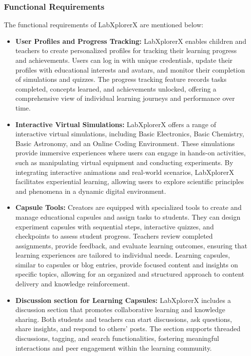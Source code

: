 \subsubsection{Functional Requirements}The functional requirements of LabXplorerX are mentioned below:
\begin{itemize}
    \item \textbf{User Profiles and Progress Tracking:} LabXplorerX enables children and teachers to create personalized profiles for tracking their learning progress and achievements. Users can log in with unique credentials, update their profiles with educational interests and avatars, and monitor their completion of simulations and quizzes. The progress tracking feature records tasks completed, concepts learned, and achievements unlocked, offering a comprehensive view of individual learning journeys and performance over time.

    \item \textbf{Interactive Virtual Simulations:} LabXplorerX offers a range of interactive virtual simulations, including Basic Electronics, Basic Chemistry, Basic Astronomy, and an Online Coding Environment. These simulations provide immersive experiences where users can engage in hands-on activities, such as manipulating virtual equipment and conducting experiments. By integrating interactive animations and real-world scenarios, LabXplorerX facilitates experiential learning, allowing users to explore scientific principles and phenomena in a dynamic digital environment.

    \item \textbf{Capsule Tools: } Creators are equipped with specialized tools to create and manage educational capsules and assign tasks to students. They can design experiment capsules with sequential steps, interactive quizzes, and checkpoints to assess student progress. Teachers review completed assignments, provide feedback, and evaluate learning outcomes, ensuring that learning experiences are tailored to individual needs. Learning capsules, similar to capsules or blog entries, provide focused content and insights on specific topics, allowing for an organized and structured approach to content delivery and knowledge reinforcement.

    \item \textbf{Discussion section for Learning Capsules:} LabXplorerX includes a discussion section that promotes collaborative learning and knowledge sharing. Both students and teachers can start discussions, ask questions, share insights, and respond to others' posts. The section supports threaded discussions, tagging, and search functionalities, fostering meaningful interactions and peer engagement within the learning community.


\end{itemize}
